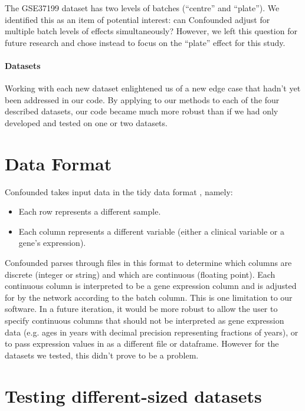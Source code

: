 \documentclass{article}
\begin{document}
The GSE37199 dataset has two levels of batches (``centre'' and ``plate'').
We identified this as an item of potential interest: can Confounded adjust for multiple batch levels of effects simultaneously?
However, we left this question for future research and chose instead to focus on the ``plate'' effect for this study.

\paragraph{Datasets}

Working with each new dataset enlightened us of a new edge case that hadn't yet been addressed in our code.
By applying to our methods to each of the four described datasets, our code became much more robust than if we had only developed and tested on one or two datasets.

\section{Data Format}

Confounded takes input data in the tidy data format \cite{wickham_tidy_2014-1}, namely:

\begin{itemize}
	\item Each row represents a different sample.
	\item Each column represents a different variable (either a clinical variable or a gene's expression).
\end{itemize}

Confounded parses through files in this format to determine which columns are discrete (integer or string) and which are continuous (floating point).
Each continuous column is interpreted to be a gene expression column and is adjusted for by the network according to the batch column.
This is one limitation to our software.
In a future iteration, it would be more robust to allow the user to specify continuous columns that should not be interpreted as gene expression data (e.g. ages in years with decimal precision representing fractions of years), or to pass expression values in as a different file or dataframe.
However for the datasets we tested, this didn't prove to be a problem.

\section{Testing different-sized datasets}
\end{document}
